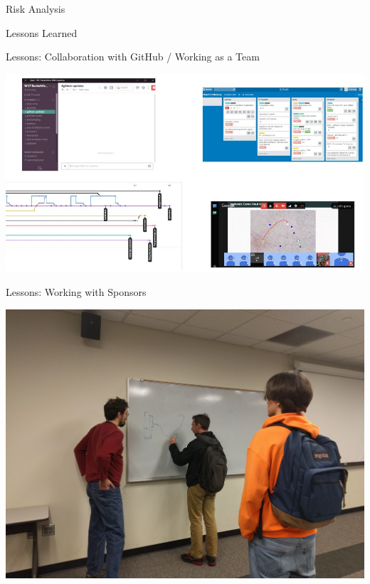 \documentclass[smaller, aspectratio=169]{beamer}
\begin{document}
  \begin{frame}[standout]
    \Huge Risk Analysis
  \end{frame}

  \begin{frame}[standout]
    Lessons Learned
  \end{frame}

  \begin{frame}{Lessons: Collaboration with GitHub / Working as a Team}
    \begin{center}
      \includegraphics[scale=.45]{./imgs/git.jpg}
    \end{center}
  \end{frame}

  \begin{frame}{Lessons: Working with Sponsors}
    \begin{center}
      \includegraphics[scale=.15]{./imgs/wws.jpg}
    \end{center}
  \end{frame}
\end{document}
